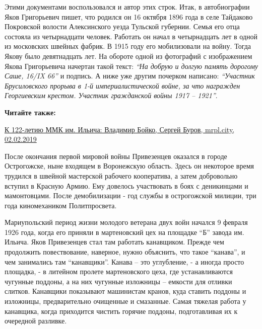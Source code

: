 
Этими документами воспользовался и автор этих строк. Итак, в автобиографии Яков
Григорьевич пишет, что родился он 16 октября 1896 года в селе Тайдаково
Покровской волости Алексинского уезда Тульской губернии. Семья его отца
состояла из четырнадцати человек. Работать он начал в четырнадцать лет в одной
из московских швейных фабрик. В 1915 году его мобилизовали на войну. Тогда
Якову было девятнадцать лет. На обороте одной из фотографий с изображением
Якова Григорьевича начертан такой текст: \emph{\enquote{На добрую и долгую память дорогому
Саше, 16/IX 66}} и подпись. А ниже уже другим почерком написано: \emph{\enquote{Участник
Брусиловского прорыва в 1-й империалистической войне, за что награжден
Георгиевским крестом. Участник гражданской войны 1917 – 1921}}. 


\textbf{Читайте также:} 

\href{https://archive.org/details/02_02_2019.sergij_burov.mrpl_city.k_122_letiu_mkk_im_iljicha_vladimir_bojko}{%
К 122-летию ММК им. Ильича: Владимир Бойко, Сергей Буров, mrpl.city, 02.02.2019}

После окончания первой мировой войны Привезенцев оказался в городе Острогожске,
ныне входящем в Воронежскую область. Здесь он некоторое время трудился в
швейной мастерской рабочего кооператива, а затем добровольно вступил в Красную
Армию. Ему довелось участвовать в боях с деникинцами и мамонтовцами. После
демобилизации - год службы в острогожской милиции, три года киномехаником
Политпросвета.

Мариупольский период жизни молодого ветерана двух войн начался 9 февраля 1926
года, когда его приняли в мартеновский цех на площадке \enquote{Б} завода им. Ильича.
Яков Привезенцев стал там работать канавщиком. Прежде чем продолжить
повествование, наверное, нужно объяснить, что такое \enquote{канава}, и чем занимались
там \enquote{канавщики}. Канава – это углубление, - а иногда просто площадка, - в
литейном пролете мартеновского цеха, где устанавливаются чугунные поддоны, а на
них чугунные изложницы – емкости для отливки слитков. Канавщики показывают
машинистам кранов, куда ставить поддоны и изложницы, предварительно очищенные и
смазанные. Самая тяжелая работа у канавщика, когда приходится чистить горячие
поддоны, подготавливая их к очередной разливке.


